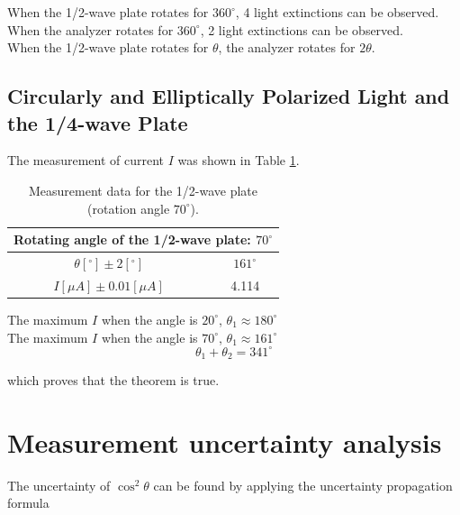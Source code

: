 \documentclass{article}
\begin{document}
When the 1/2-wave plate rotates for $360^\circ$, 4 light extinctions can be observed.\\

When the analyzer rotates for $360^\circ$, 2 light extinctions can be observed.\\

When the 1/2-wave plate rotates for $\theta$, the analyzer rotates for $2\theta$.\\

\newpage


\subsection{Circularly and Elliptically Polarized Light and the 1/4-wave Plate}




\newpage



\newpage


\newpage

The measurement of current $I$ was shown in Table \ref{tab-6}.
\begin{table}[!h]
\begin{center}
\begin{tabular}{|c|c|}
\hline
\multicolumn{2}{|c|}{Rotating angle of the 1/2-wave plate: $70^\circ$}\\
\hline
$\theta[^\circ]\pm2[^\circ]$		&	$161^\circ$	\\
\hline
$I[\mu A]\pm0.01[\mu A]$	&	4.114	\\
\hline
\end{tabular}
\caption{Measurement data for the 1/2-wave plate (rotation angle $70^\circ$).}
\label{tab-6}
\end{center}
\end{table}

The maximum $I$ when the angle is $20^\circ$, $\theta_1\approx180^\circ$\\

The maximum $I$ when the angle is $70^\circ$, $\theta_1\approx161^\circ$\\
$$\theta_1+\theta_2=341^\circ$$

which proves that the theorem is true.

\section{Measurement uncertainty analysis}

The uncertainty of $\cos^2\theta$ can be  found by applying the uncertainty propagation formula
\end{document}
